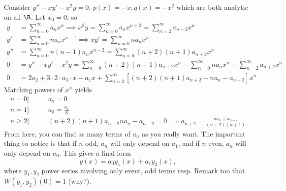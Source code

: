 \begin{example}
    Consider $y'' - xy' - x^2y = 0$, $p(x) = -x, q(x) = -x^2$ which are both analytic on all $\R$. Let $x_0 = 0$, so 
    \begin{align*}
        y &= \sum_{n=0}^\infty a_nx^n \implies x^2 y = \sum_{n=0}^\infty a_n x^{n+2} = \sum_{n = 2}^\infty a_{n-2}x^n\\
        y' &= \sum_{n=0}^\infty na_nx^{n-1} \implies xy' = \sum_{n=0}^\infty n a_nx^n\\
        y'' &= \sum_{n = 0}^\infty n(n-1)a_nx^{n-2} = \sum_{n=0}^\infty (n+2)(n+1)a_{n+2}x^{n}\\
        0 &= y'' - xy' - x^2y = \sum_{n=0}^\infty (n+2)(n+1)a_{n+2}x^{n} -\sum_{n=0}^\infty n a_nx^n - \sum_{n = 2}^\infty a_{n+2}x^n\\
        0 &= 2a_2 + 3 \cdot 2 \cdot a_3 \cdot x - a_1 x + \sum_{n=2}^\infty [(n+2)(n+1)a_{n+2}-na_n-a_{n-2}]x^n
    \end{align*}
    Matching powers of $x^n$ yields
    \begin{align*}
        n=0] & \qquad a_2 = 0\\
        n=1] & \qquad a_3 = \frac{a_1}{6}\\
        n \geq 2] & \qquad (n+2)(n+1)a_{n+2}  na_{n} - a_{n-2} = 0 \implies a_{n+2} = \frac{na_n + a_{n-2}}{(n+2)(n+1)}
    \end{align*}
    From here, you can find as many terms of $a_n$ as you really want. The important thing to notice is that if $n$ odd, $a_n$ will only depend on $a_1$, and if $n$ even, $a_n$ will only depend on $a_0$. This gives a final form \[
    y(x) = a_0 y_1(x) + a_1 y_2(x),    
    \]
    where $y_1, y_2$ power series involving only event, odd terms resp. Remark too that $W(y_1, y_2)(0) = 1$ (why?).
\end{example}